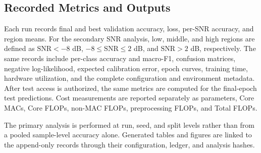 \subsection{Recorded Metrics and Outputs}
Each run records final and best validation accuracy, loss, per-SNR accuracy,
and region means. For the secondary SNR analysis, low, middle, and high
regions are defined as $\mathrm{SNR}<-8$ dB, $-8\leq\mathrm{SNR}\leq 2$ dB,
and $\mathrm{SNR}>2$ dB, respectively. The same records include per-class
accuracy and macro-F1, confusion
matrices, negative log-likelihood, expected calibration error, epoch curves,
training time, hardware utilization, and the complete configuration and
environment metadata. After test access is authorized, the same metrics are
computed for the final-epoch test predictions. Cost measurements are reported
separately as parameters, Core MACs, Core FLOPs, non-MAC FLOPs, preprocessing
FLOPs, and Total FLOPs.

The primary analysis is performed at run, seed, and split levels rather than
from a pooled sample-level accuracy alone. Generated tables and figures are
linked to the append-only records through their configuration, ledger, and
analysis hashes.
